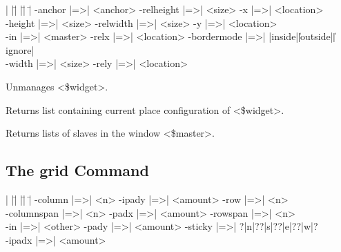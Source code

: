 \begin{tabbing}
|  |\=|               |\=|              |\= \kill
 \> -anchor |=>| <anchor>    \> -relheight |=>| <size> \> -x |=>| <location> \\
 \> -height |=>| <size>	\> -relwidth |=>| <size>  \> -y |=>| <location> \\
 \> -in |=>| <master>	\> -relx |=>| <location>  \> -bordermode |=>| |inside|\||outside|\||ignore| \\
 \> -width |=>| <size>	\> -rely |=>| <location>  \\
\end{tabbing}

\begin{enum}{1cm}

Unmanages <\$widget>.

Returns list containing current place configuration of <\$widget>.

Returns lists of slaves in the window <\$master>.

\end{enum}

\subsection*{The grid Command}
\vspace{-4pt}
\begin{enum}{1cm}


\end{enum}

\begin{tabbing}
|  |\=|               |\=|              |\= \kill
 \> -column |=>| <n>    	\> -ipady |=>| <amount> \> -row |=>| <n> \\
 \> -columnspan |=>| <n>	\> -padx |=>| <amount>  \> -rowspan |=>| <n> \\
 \> -in |=>| <other>		\> -pady |=>| <amount>  \> -sticky |=>| ?|n|??|s|??|e|??|w|? \\
 \> -ipadx |=>| <amount>	\> \\
\end{tabbing}

